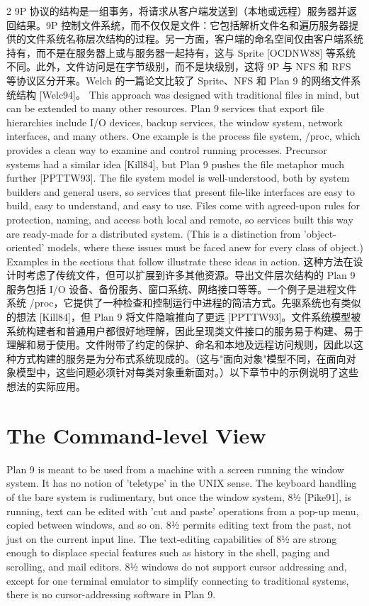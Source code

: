 \documentclass{article}
\begin{document}
\begin{paracol}{2}
\switchcolumn
9P 协议的结构是一组事务，将请求从客户端发送到（本地或远程）服务器并返回结果。9P 控制文件系统，而不仅仅是文件：它包括解析文件名和遍历服务器提供的文件系统名称层次结构的过程。另一方面，客户端的命名空间仅由客户端系统持有，而不是在服务器上或与服务器一起持有，这与 Sprite [OCDNW88] 等系统不同。此外，文件访问是在字节级别，而不是块级别，这将 9P 与 NFS 和 RFS 等协议区分开来。Welch 的一篇论文比较了 Sprite、NFS 和 Plan 9 的网络文件系统结构 [Welc94]。
\switchcolumn*
This approach was designed with traditional files in mind, but can be extended to many other resources. Plan 9 services that export file hierarchies include I/O devices, backup services, the window system, network interfaces, and many others. One example is the process file system, /proc, which provides a clean way to examine and control running processes. Precursor systems had a similar idea [Kill84], but Plan 9 pushes the file metaphor much further [PPTTW93]. The file system model is well-understood, both by system builders and general users, so services that present file-like interfaces are easy to build, easy to understand, and easy to use. Files come with agreed-upon rules for protection, naming, and access both local and remote, so services built this way are ready-made for a distributed system. (This is a distinction from 'object-oriented' models, where these issues must be faced anew for every class of object.) Examples in the sections that follow illustrate these ideas in action.
\switchcolumn
这种方法在设计时考虑了传统文件，但可以扩展到许多其他资源。导出文件层次结构的 Plan 9 服务包括 I/O 设备、备份服务、窗口系统、网络接口等等。一个例子是进程文件系统 /proc，它提供了一种检查和控制运行中进程的简洁方式。先驱系统也有类似的想法 [Kill84]，但 Plan 9 将文件隐喻推向了更远 [PPTTW93]。文件系统模型被系统构建者和普通用户都很好地理解，因此呈现类文件接口的服务易于构建、易于理解和易于使用。文件附带了约定的保护、命名和本地及远程访问规则，因此以这种方式构建的服务是为分布式系统现成的。（这与"面向对象"模型不同，在面向对象模型中，这些问题必须针对每类对象重新面对。）以下章节中的示例说明了这些想法的实际应用。
\switchcolumn*
\section*{The Command-level View}
Plan 9 is meant to be used from a machine with a screen running the window system. It has no notion of 'teletype' in the UNIX sense. The keyboard handling of the bare system is rudimentary, but once the window system, 8½ [Pike91], is running, text can be edited with 'cut and paste' operations from a pop-up menu, copied between windows, and so on. 8½ permits editing text from the past, not just on the current input line. The text-editing capabilities of 8½ are strong enough to displace special features such as history in the shell, paging and scrolling, and mail editors. 8½ windows do not support cursor addressing and, except for one terminal emulator to simplify connecting to traditional systems, there is no cursor-addressing software in Plan 9.
\switchcolumn

\end{paracol}
\end{document}
